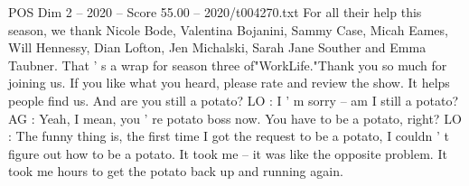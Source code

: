 \begin{textsample}{POS Dim 2 – 2020 – Score 55.00 – 2020/t004270.txt}
For all their help this season, we thank Nicole Bode, Valentina Bojanini, Sammy Case, Micah Eames, Will Hennessy, Dian Lofton, Jen Michalski, Sarah Jane Souther and Emma Taubner.
That ' s a wrap for season three of"WorkLife."Thank you so much for joining us.
If you like what you heard, please rate and review the show.
It helps people find us.
And are you still a potato?
LO : I ' m sorry -- am I still a potato?
AG : Yeah, I mean, you ' re potato boss now.
You have to be a potato, right?
LO : The funny thing is, the first time I got the request to be a potato, I couldn ' t figure out how to be a potato.
It took me -- it was like the opposite problem.
It took me hours to get the potato back up and running again.

\end{textsample}
